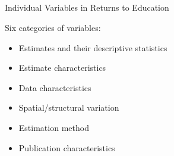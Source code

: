 \documentclass{beamer} %
\begin{document}



\subsection{}

\begin{frame}{Individual Variables in Returns to Education}



  \begin{block}{Six categories of variables:}
    \begin{itemize}
      \item Estimates and their descriptive statistics
      \item Estimate characteristics
      \item Data characteristics
      \item Spatial/structural variation
      \item Estimation method
      \item Publication characteristics
    \end{itemize}
  \end{block}

\end{frame}
\end{document}
